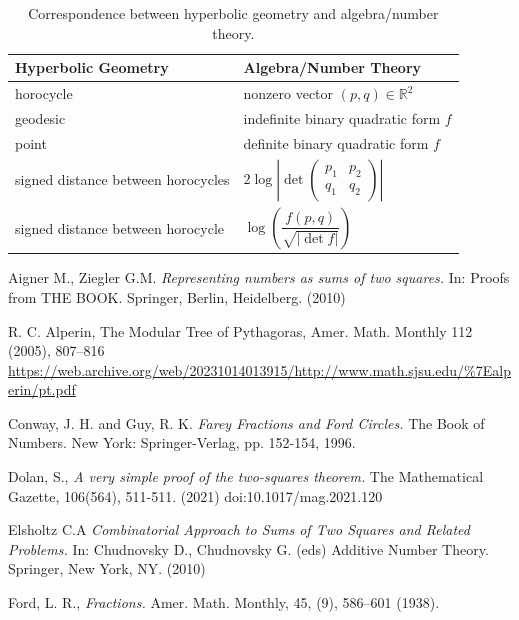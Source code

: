 \documentclass[12pt,a4paper]{amsart}
\begin{document}
\begin{table}[h]
\renewcommand{\arraystretch}{2}
\begin{tabular}{|l|l|}
\textbf{Hyperbolic Geometry} & \textbf{Algebra/Number Theory} \\
\hline
horocycle & nonzero vector $(p,q) \in \mathbb{R}^2$ \\
\hline
geodesic & indefinite binary quadratic form $f$ \\
point & definite binary quadratic form $f$ \\
signed distance between horocycles & $2 \log \left| \det \begin{pmatrix} p_1 & p_2 \\ q_1 & q_2 \end{pmatrix} \right|$ \\
signed distance between horocycle & $\log \left( \dfrac{f(p,q)}{\sqrt{|\det f|}} \right)$ \\
\end{tabular}
\caption{Correspondence between hyperbolic geometry and algebra/number theory.}
\end{table}


Aigner M., Ziegler G.M.  
\textit{Representing numbers as sums of two squares.} In: Proofs from THE BOOK. Springer, Berlin, Heidelberg. (2010)

 R. C. Alperin, 
 The Modular Tree of Pythagoras,
 Amer. Math. Monthly 112 (2005), 807–816
 \url{https://web.archive.org/web/20231014013915/http://www.math.sjsu.edu/%7Ealperin/pt.pdf}

Conway, J. H. and Guy, R. K. \textit{Farey Fractions and Ford
Circles.} The Book of Numbers. New York: Springer-Verlag, pp. 152-154, 1996.

Dolan, S., 
\textit{A very simple proof of the two-squares theorem.}
The Mathematical Gazette, 106(564), 511-511. (2021) doi:10.1017/mag.2021.120

Elsholtz C.A 
\textit{Combinatorial Approach to Sums of Two Squares and Related Problems.}
 In: Chudnovsky D., Chudnovsky G. (eds) Additive Number Theory. Springer, New York, NY.
 (2010) 


Ford, L. R.,  \textit{Fractions.} Amer. Math. Monthly, 45, (9), 586–601 (1938).
\end{document}
